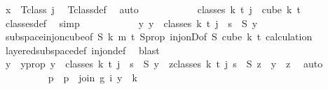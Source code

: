 \begin{isabellebody}
\ {\isacartoucheopen}x\ {\isasymin}\ T{\isacharunderscore}{\kern0pt}class\ j{\isacartoucheclose}\ \isamarkupfalse%
\ T{\isacharunderscore}{\kern0pt}class{\isacharunderscore}{\kern0pt}def\ \isamarkupfalse%
\ auto\isanewline
\ \ \ \ \ \ \ \ \isamarkupfalse%
\ \isamarkupfalse%
\ {\isacharasterisk}{\kern0pt}{\isacharcolon}{\kern0pt}{\isachardoublequoteopen}classes\ k\ t\ j\ {\isasymsubseteq}\ cube\ k\ {\isacharparenleft}{\kern0pt}t{\isacharplus}{\kern0pt}{}{\isacharparenright}{\kern0pt}{\isachardoublequoteclose}\ \isamarkupfalse%
\ classes{\isacharunderscore}{\kern0pt}def\ \isamarkupfalse%
\ simp\isanewline
\ \ \ \ \ \ \ \ \isamarkupfalse%
\ \isamarkupfalse%
\ {\isachardoublequoteopen}{\isasymexists}{\isacharbang}{\kern0pt}y{\isachardot}{\kern0pt}\ y\ {\isasymin}\ classes\ k\ t\ j\ {\isasymand}\ s\ {\isacharequal}{\kern0pt}\ S\ y{\isachardoublequoteclose}\ \isamarkupfalse%
\ subspace{\isacharunderscore}{\kern0pt}inj{\isacharunderscore}{\kern0pt}on{\isacharunderscore}{\kern0pt}cube{\isacharbrackleft}{\kern0pt}of\ S\ k\ m\ {\isachardoublequoteopen}t{\isacharplus}{\kern0pt}{}{\isachardoublequoteclose}{\isacharbrackright}{\kern0pt}\ S{\isacharunderscore}{\kern0pt}prop\ inj{\isacharunderscore}{\kern0pt}onD{\isacharbrackleft}{\kern0pt}of\ S\ {\isachardoublequoteopen}cube\ k\ {\isacharparenleft}{\kern0pt}t{\isacharplus}{\kern0pt}{}{\isacharparenright}{\kern0pt}{\isachardoublequoteclose}{\isacharbrackright}{\kern0pt}\ calculation\ \isamarkupfalse%
\ layered{\isacharunderscore}{\kern0pt}subspace{\isacharunderscore}{\kern0pt}def\ inj{\isacharunderscore}{\kern0pt}on{\isacharunderscore}{\kern0pt}def\ \isamarkupfalse%
\ blast\isanewline
\ \ \ \ \ \ \ \ \isamarkupfalse%
\ \isamarkupfalse%
\ y\ \ y{\isacharunderscore}{\kern0pt}prop{\isacharcolon}{\kern0pt}\ {\isachardoublequoteopen}y\ {\isasymin}\ classes\ k\ t\ j\ {\isasymand}\ s\ {\isacharequal}{\kern0pt}\ S\ y\ {\isasymand}\ {\isacharparenleft}{\kern0pt}{\isasymforall}z{\isasymin}classes\ k\ t\ j{\isachardot}{\kern0pt}\ s\ {\isacharequal}{\kern0pt}\ S\ z\ {\isasymlongrightarrow}\ y\ {\isacharequal}{\kern0pt}\ z{\isacharparenright}{\kern0pt}{\isachardoublequoteclose}\ \isamarkupfalse%
\ auto\isanewline
\isanewline
\ \ \ \ \ \ \ \ \isamarkupfalse%
\ p\ \ {\isachardoublequoteopen}p\ {\isasymequiv}\ join\ {\isacharparenleft}{\kern0pt}{\isasymlambda}g{\isasymin}{\isacharbraceleft}{\kern0pt}{\isachardot}{\kern0pt}{\isachardot}{\kern0pt}{\isacharless}{\kern0pt}{}{\isacharbraceright}{\kern0pt}{\isachardot}{\kern0pt}\ i{\isacharparenright}{\kern0pt}\ y\ {}\ k{\isachardoublequoteclose}\isanewline

\end{isabellebody}
